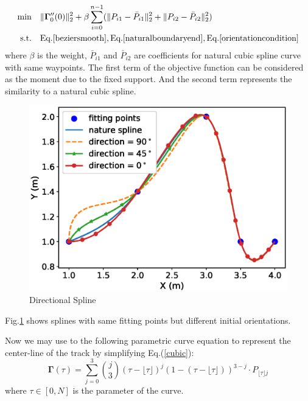 \documentclass[conference, onecolumn]{IEEEtran}
\begin{document}
\begin{equation}
	\begin{aligned}
		\min \quad & \| \mathbf{\Gamma}_{0}''(0)\| _2^2+\beta \sum_{i = 0}^{n-1}(\| P_{i1}-\bar{P}_{i1}\| _2^2+ \| P_{i2}-\bar{P}_{i2}\| _2^2)\\
		\textrm{s.t.} \quad & \textrm{Eq.\ref{beziersmooth}},\textrm{Eq.\ref{naturalboundaryend}},\textrm{Eq.\ref{orientationcondition}}
	\end{aligned}
\end{equation}
where $\beta$ is the weight, $\bar{P}_{i1}$ and $\bar{P}_{i2}$ are coefficients for natural cubic spline curve with same waypoints. The first term of the objective function can be considered as the moment due to the fixed support. And the second term represents the similarity to a natural cubic spline.


\begin{figure}[h]
	\centering
	\includegraphics[scale=0.5]{spline.eps}
	\caption{Directional Spline}
	\label{fig_directional_spline}
\end{figure}

Fig.\ref{fig_directional_spline} shows splines with same fitting points but different initial orientations. 

Now we may use to the following parametric curve equation to represent the center-line of the track by simplifying Eq.(\ref{cubic}):
\begin{equation}\label{centerline}
	\mathbf{\Gamma}( \tau)=\sum_{j = 0}^{3}\binom{j}{3}  (\tau-\lfloor \tau\rfloor)^j(1-(\tau-\lfloor \tau \rfloor) )^{3-j}\cdot P_{\lfloor \tau \rfloor j}
\end{equation} 
where $\tau \in [0,N]$ is the parameter of the curve. 
\end{document}
